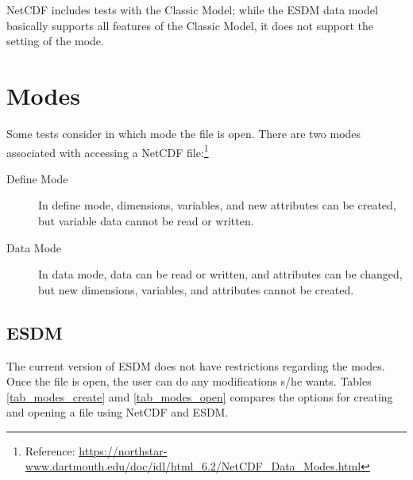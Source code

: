 NetCDF includes tests with the Classic Model; while the ESDM data model basically supports all features of the Classic Model, it does not support the setting of the mode.

\section{Modes}


Some tests consider in which mode the file is open. There are two modes associated with accessing a NetCDF file:\footnote{Reference: \url{https://northstar-www.dartmouth.edu/doc/idl/html_6.2/NetCDF_Data_Modes.html}}

\begin{description}

\item[Define Mode] In define mode, dimensions, variables, and new attributes can be created, but variable data cannot be read or written.

\item[Data Mode] In data mode, data can be read or written, and attributes can be changed, but new dimensions, variables, and attributes cannot be created.

\end{description}

\subsection{ESDM}


The current version of ESDM does not have restrictions regarding the modes. Once the file is open, the user can do any modifications s/he wants. Tables \ref{tab_modes_create} amd \ref{tab_modes_open} compares the options for creating and opening a file using NetCDF and ESDM.

